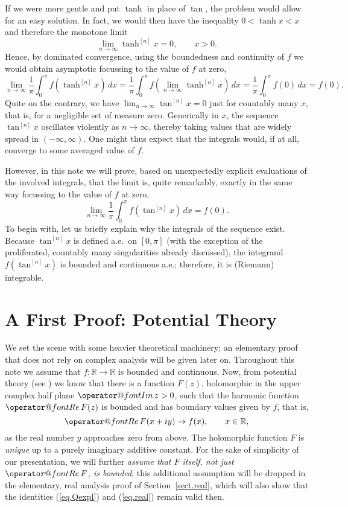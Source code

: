 \documentclass[10pt]{amsart}
\makeatletter
\newcommand{\R}{{\mathbb  R}}
\renewcommand{\Re}{{\operator@font Re\,}}
\renewcommand{\Im}{{\operator@font Im\,}}
\makeatother
\begin{document}
If we were more gentle and put $\tanh$ in place of $\tan$, the problem would allow for an easy solution. In fact,
we would then have the inequality $0 < \tanh x<x$ and therefore the monotone limit
\begin{equation}\label{eq.tanh}
\lim_{n\to\infty} \tanh^{[n]} x = 0,\qquad x>0.
\end{equation}
Hence, by dominated convergence, using the boundedness and continuity of $f$ we would obtain asymptotic focussing to the value of $f$ at zero,
\[
\lim_{n\to\infty} \frac{1}{\pi}\int_0^\pi f(\tanh^{[n]}x)\,dx = \frac{1}{\pi}\int_0^\pi f(\lim_{n\to\infty} \tanh^{[n]}x)\,dx = \frac{1}{\pi}\int_0^\pi f(0)\,dx = f(0).
\]
Quite on the contrary, we have $\lim_{n\to\infty} \tan^{[n]} x = 0$ just for countably many $x$, that is, for a negligible set
of measure zero. Generically in $x$, the sequence $\tan^{[n]} x$ oscillates violently as $n \to \infty$, thereby taking values that are widely spread in
$(-\infty,\infty)$.
One might thus expect that the integrals would, if at all, converge to some averaged value of $f$.

However, in this note we will prove, based on unexpectedly explicit evaluations of the involved integrals,
that the limit is, quite remarkably, exactly in the same way focussing to the value of $f$ at zero,
\begin{equation}\label{eq.claim}
{\lim_{n\to\infty}\frac{1}{\pi}\int_0^\pi f(\tan^{[n]}x)\,dx = f(0).}
\end{equation}
To begin with, let us briefly explain why the integrals of the sequence exist. Because $\tan^{[n]} x$ is defined a.e.~on $[0,\pi]$ (with the exception of the proliferated, countably many
singularities already discussed), the integrand $f(\tan^{[n]} x)$ is bounded and continuous a.e.; therefore,
it is (Riemann) integrable.

\section{A First Proof: Potential Theory}
\noindent
We set the scene with some heavier theoretical machinery; an elementary proof that does not
rely on complex analysis will be given later on. Throughout this note we assume that $f:\R \to \R$ is bounded and continuous.
Now, from potential theory (see \cite[Thms. 15.1a, 15.4d]{Hen}) we know that there is a function $F(z)$, holomorphic
in the upper complex half plane $\Im z >0$, such that the harmonic function $\Re F(z)$ is bounded and has boundary values given by $f$, that is,
\begin{equation}\label{eq.F}
\Re F(x+ i y) \to f(x), \qquad x\in\R,
\end{equation}
as the real number $y$ approaches zero from above. The holomorphic function $F$ is \emph{unique}
up to a purely imaginary additive constant. For the sake of simplicity of our presentation, we will further
{\em assume that $F$ itself, not just $\Re F$, is bounded}\/; this additional assumption will be dropped
in the elementary, real analysis proof of Section~\ref{sect.real}, which  will also show that the identities (\ref{eq.Qexpl}) and (\ref{eq.real})
remain valid then.
\end{document}
